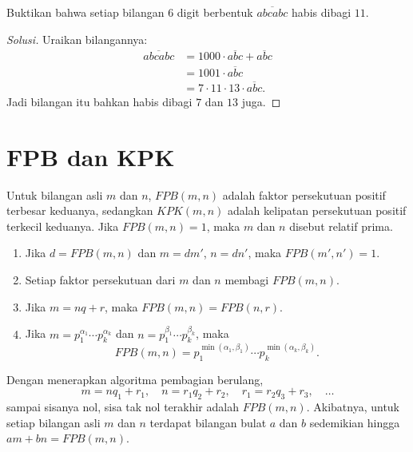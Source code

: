 \documentclass[12pt]{scrartcl}
\begin{document}
\begin{example}
Buktikan bahwa setiap bilangan $6$ digit berbentuk $\overline{abcabc}$ habis dibagi $11$.
\end{example}
\begin{proof}[Solusi]
Uraikan bilangannya:
\begin{align*}
\overline{abcabc} &= 1000 \cdot \overline{abc} + \overline{abc} \\
&= 1001 \cdot \overline{abc} \\
&= 7 \cdot 11 \cdot 13 \cdot \overline{abc}.
\end{align*}
Jadi bilangan itu bahkan habis dibagi $7$ dan $13$ juga.
\end{proof}

\section{FPB dan KPK}

\begin{definition}
Untuk bilangan asli $m$ dan $n$, $FPB(m, n)$ adalah faktor persekutuan positif
terbesar keduanya, sedangkan $KPK(m, n)$ adalah kelipatan persekutuan positif
terkecil keduanya. Jika $FPB(m, n) = 1$, maka $m$ dan $n$ disebut relatif prima.
\end{definition}

\begin{fact}
\begin{enumerate}
    \item Jika $d = FPB(m, n)$ dan $m = dm'$, $n = dn'$, maka $FPB(m', n') = 1$.
    \item Setiap faktor persekutuan dari $m$ dan $n$ membagi $FPB(m, n)$.
    \item Jika $m = nq + r$, maka $FPB(m, n) = FPB(n, r)$.
    \item Jika $m = p_1^{\alpha_1} \cdots p_k^{\alpha_k}$ dan
    $n = p_1^{\beta_1} \cdots p_k^{\beta_k}$, maka
    \[ FPB(m, n) = p_1^{\min(\alpha_1, \beta_1)} \cdots p_k^{\min(\alpha_k, \beta_k)}. \]
\end{enumerate}
\end{fact}

\begin{theorem}
Dengan menerapkan algoritma pembagian berulang,
\[ m = nq_1 + r_1, \quad n = r_1q_2 + r_2, \quad r_1 = r_2q_3 + r_3, \quad \dots \]
sampai sisanya nol, sisa tak nol terakhir adalah $FPB(m, n)$.
Akibatnya, untuk setiap bilangan asli $m$ dan $n$ terdapat bilangan bulat $a$ dan $b$
sedemikian hingga $am + bn = FPB(m, n)$.
\end{theorem}
\end{document}

